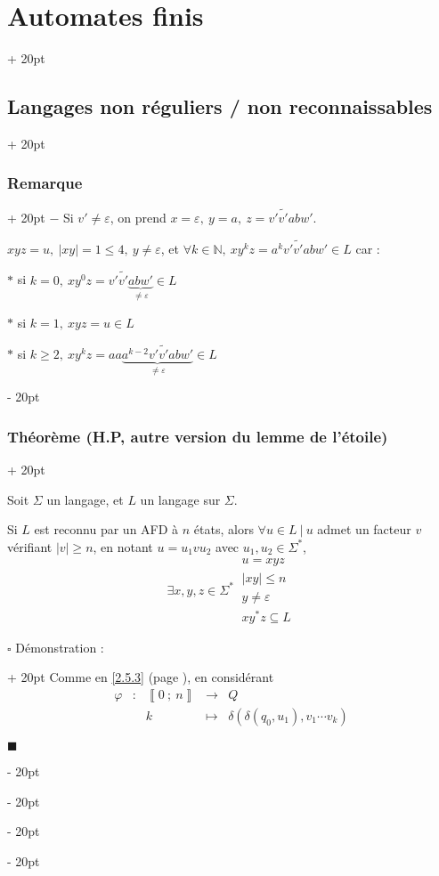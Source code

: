 \documentclass[a4paper, 12pt, twoside]{article}
\newcommand{\N}{\mathbb{N}} %
\newcommand{\nset}[2]{\left\llbracket #1\ ;\ #2 \right\rrbracket}
\newcommand{\abs}[1]{\left\lvert #1 \right\rvert}
\renewcommand{\le}{\leqslant}
\renewcommand{\ge}{\geqslant}
\newcommand{\ind}[1][20pt]{\advance\leftskip + #1}
\newcommand{\deind}[1][20pt]{\advance\leftskip - #1}
\newenvironment{indt}[2][20pt]{#2 \par \ind[#1]}{\par \deind} %
\newenvironment{proof}[1][{Démonstration :}]{\begin{indt}{$\square$ #1}}{$\blacksquare$ \end{indt}}
\begin{document}
\begin{indt}{\section{Automates finis}}
\begin{indt}{\subsection{Langages non réguliers / non reconnaissables}}
\begin{indt}{\subsubsection{Remarque}}
                $-$ Si $v' \neq \varepsilon$, on prend $x = \varepsilon,\ y = a,\ z = v' \widetilde{v'} a b w'$.

                $xyz = u,\ \abs {xy} = 1 \le 4,\ y \neq \varepsilon$, et $\forall k \in \N,\ xy^kz = a^k v' \widetilde{v'} a b w' \in L$ car :

                $*$ si $k = 0,\ xy^0z = v' \widetilde{v'} \underbrace{abw'}_{\neq \varepsilon} \in L$

                $*$ si $k = 1,\ xyz = u \in L$

                $*$ si $k \ge 2,\ xy^kz = aa \underbrace{a^{k - 2} v' \widetilde {v'} a b w'}_{\neq \varepsilon} \in L$
            \end{indt}

            \vspace{12pt}
            
            \begin{indt}{\subsubsection{Théorème (H.P, autre version du lemme de l'étoile)}}
                \begin{emphBox}
                    Soit $\Sigma$ un langage, et $L$ un langage sur $\Sigma$.
                    
                    Si $L$ est reconnu par un AFD à $n$ états, alors $\forall u \in L\ |\ u$ admet un facteur $v$ vérifiant $\abs v \ge n$, en notant $u = u_1 v u_2$ avec $u_1, u_2 \in \Sigma^*$,
                    \[
                        \exists x, y, z \in \Sigma^*\
                        \begin{array}{|l}
                            u = xyz
                            \\
                            \abs{xy} \le n
                            \\
                            y \neq \varepsilon
                            \\
                            xy^*z \subseteq L
                        \end{array}
                    \]
                \end{emphBox}

                \begin{proof}
                    Comme en \ref{2.5.3} (page \pageref{2.5.3}), en considérant
                    \[
                        \begin{array}{ccccc}
                            \varphi & : & \nset 0 n & \longrightarrow & Q
                            \\
                                    && k & \longmapsto & \delta(\delta(q_0, u_1), v_1 \cdots v_k)
                        \end{array}
                    \]


\end{proof}
\end{indt}
\end{indt}
\end{indt}
\end{document}
